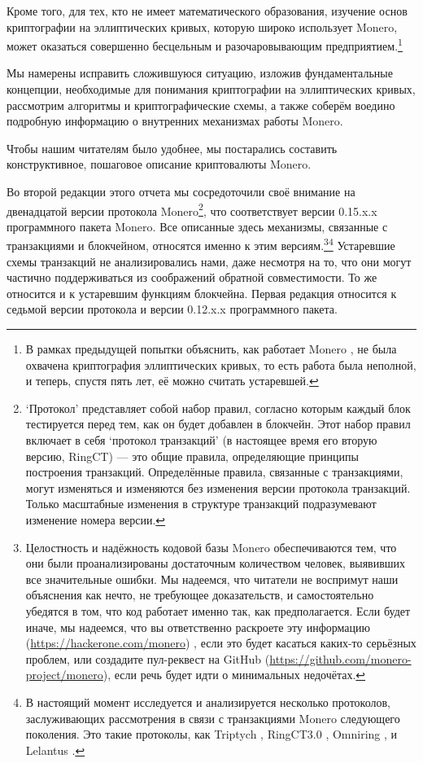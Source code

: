 Кроме того, для тех, кто не имеет математического образования, изучение основ криптогра\-фии на эллиптических кривых, которую широко использует Monero, может оказаться совер\-шенно бесцельным и разочаровывающим предприятием.\footnote{В рамках предыдущей попытки объяснить, как работает Monero \cite{MRL-0003-about-monero}, не была охвачена криптография эллиптических кривых, то есть работа была неполной, и теперь, спустя пять лет, её можно считать устаревшей.}

Мы намерены исправить сложившуюся ситуацию, изложив фундаментальные концепции, необходимые для понимания криптографии на эллиптических кривых, рассмотрим алгорит\-мы и криптографические схемы, а также соберём воедино подробную информацию о внутрен\-них механизмах работы Monero.

Чтобы нашим читателям было удобнее, мы постарались составить конструктивное, пошаговое описание криптовалюты Monero.

Во второй редакции этого отчета мы сосредоточили своё внимание на двенадцатой версии протокола Monero\footnote{`Протокол' представляет собой набор правил, согласно которым каждый блок тестируется перед тем, как он будет добавлен в блокчейн. Этот набор правил включает в себя `протокол транзакций' (в настоящее время его вторую версию, RingCT) — это общие правила, определяющие принципы построения транзакций. Определённые правила, связанные с транзакциями, могут изменяться и изменяются без изменения версии протокола транзакций. Только масштабные изменения в структуре транзакций подразумевают изменение номера версии.}, что соответствует версии 0.15.x.x программного пакета Monero. Все описанные здесь механизмы, связанные с транзакциями и блокчейном, относятся именно к этим версиям.\footnote{Целостность и надёжность кодовой базы Monero обеспечиваются тем, что они были проанализированы достаточным количеством человек, выявивших все значительные ошибки. Мы надеемся, что читатели не воспримут наши объяснения как нечто, не требующее доказательств, и самостоятельно убедятся в том, что код работает именно так, как предполагается. Если будет иначе, мы надеемся, что вы ответственно раскроете эту информацию (\url{https://hackerone.com/monero}) , если это будет касаться каких-то серьёзных проблем, или создадите пул-реквест на GitHub (\url{https://github.com/monero-project/monero}), если речь будет идти о минимальных недочётах.}\footnote{В настоящий момент исследуется и анализируется несколько протоколов, заслуживающих рассмотрения в связи с транзакциями Monero следующего поколения. Это такие протоколы, как Triptych \cite{triptych-preprint}, RingCT3.0 \cite{ringct3-preprint}, Omniring \cite{omniring-paper}, и Lelantus \cite{lelantus-preprint}.} Устаревшие схемы транзакций не анализировались нами, даже несмотря на то, что они могут частично поддерживаться из соображений обратной совместимости. То же относится и к устаревшим функциям блокчейна. Первая редакция \cite{ztm-1} относится к седьмой версии протокола и версии 0.12.x.x программного пакета.




